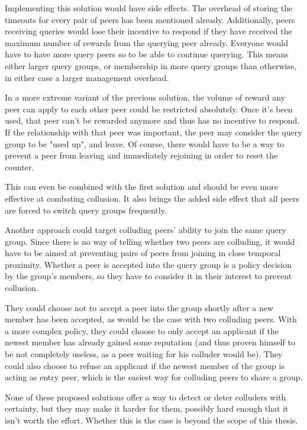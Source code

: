 Implementing this solution would have side effects. The overhead of storing the
timeouts for every pair of peers has been mentioned already. Additionally, peers
receiving queries would lose their incentive to respond if they have received
the maximum number of rewards from the querying peer already. Everyone would
have to have more query peers so to be able to continue querying. This means
either larger query groups, or membership in more query groups than otherwise,
in either case a larger management overhead.

In a more extreme variant of the previous solution, the volume of reward any
peer can apply to each other peer could be restricted absolutely. Once it's been
used, that peer can't be rewarded anymore and thus has no incentive to respond.
If the relationship with that peer was important, the peer may consider the
query group to be "used up", and leave. Of course, there would have to be a way
to prevent a peer from leaving and immediately rejoining in order to reset the
counter.

This can even be combined with the first solution and should be even more
effective at combating collusion. It also brings the added side effect that all
peers are forced to switch query groups frequently.

Another approach could target colluding peers' ability to join the same query
group. Since there is no way of telling whether two peers are colluding, it
would have to be aimed at preventing pairs of peers from joining in close
temporal proximity. Whether a peer is accepted into the query group is a policy
decision by the group's members, so they have to consider it in their interest
to prevent collusion.

They could choose not to accept a peer into the group shortly after a new member
has been accepted, as would be the case with two colluding peers. With a more
complex policy, they could choose to only accept an applicant if the newest
member has already gained some reputation (and thus proven himself to be not
completely useless, as a peer waiting for his colluder would be). They could
also choose to refuse an applicant if the newest member of the group is acting
as entry peer, which is the easiest way for colluding peers to share a group.

None of these proposed solutions offer a way to detect or deter colluders with
certainty, but they may make it harder for them, possibly hard enough that it
isn't worth the effort. Whether this is the case is beyond the scope of this
thesis.

